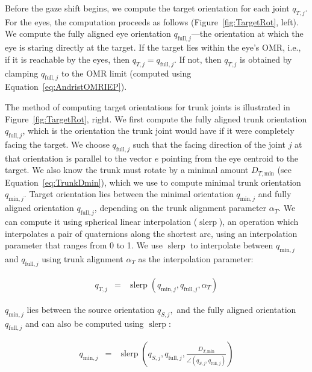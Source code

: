 Before the gaze shift begins, we compute the target orientation for each joint $q_{T,j}$. For the eyes, the computation proceeds as follows (Figure~\ref{fig:TargetRot}, left). We compute the fully aligned eye orientation $q_{\mathrm{full},j}$---the orientation at which the eye is staring directly at the target. If the target lies within the eye's OMR, i.e., if it is reachable by the eyes, then $q_{T,j} = q_{\mathrm{full},j}$. If not, then $q_{T,j}$ is obtained by clamping $q_{\mathrm{full},j}$ to the OMR limit (computed using Equation~\ref{eq:AndristOMRIEP}).

The method of computing target orientations for trunk joints is illustrated in Figure~\ref{fig:TargetRot}, right. We first compute the fully aligned trunk orientation $q_{\mathrm{full},j}$, which is the orientation the trunk joint would have if it were completely facing the target. We choose $q_{\mathrm{full},j}$ such that the facing direction of the joint $j$ at that orientation is parallel to the vector $e$ pointing from the eye centroid to the target. We also know the trunk must rotate by a minimal amount $D_{T,\mathrm{min}}$ (see Equation~\ref{eq:TrunkDmin}), which we use to compute minimal trunk orientation $q_{\mathrm{min},j}$. Target orientation lies between the minimal orientation $q_{\mathrm{min},j}$ and fully aligned orientation $q_{\mathrm{full},j}$, depending on the trunk alignment parameter $\alpha_T$. We can compute it using spherical linear interpolation ($\mathop{slerp}$), an operation which interpolates a pair of quaternions along the shortest arc, using an interpolation parameter that ranges from 0 to 1. We use $\mathop{slerp}$ to interpolate between $q_{\mathrm{min},j}$ and $q_{\mathrm{full},j}$ using trunk alignment $\alpha_T$ as the interpolation parameter:

\begin{eqnarray} \label{eq:TrunkTargetRot}
q_{T,j} &=& \mathop{slerp}( q_{\mathrm{min},j}, q_{\mathrm{full},j}, \alpha_{T} )
\end{eqnarray}

$q_{\mathrm{min},j}$ lies between the source orientation $q_{S,j},$ and the fully aligned orientation $q_{\mathrm{full},j}$ and can also be computed using $\mathop{slerp}$:

\begin{eqnarray} \label{eq:TrunkMinRot}
q_{\mathrm{min},j} &=& \mathop{slerp}(q_{S,j}, q_{\mathrm{full},j}, \frac{D_{T,\mathrm{min}}}{\angle(q_{S,j}, q_{\mathrm{full},j})})
\end{eqnarray}

